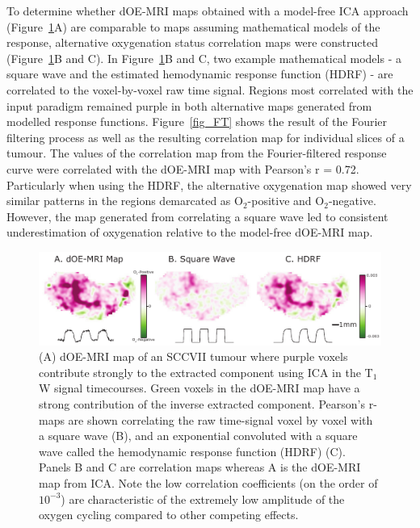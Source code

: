 To determine whether \acs{dOE-MRI} maps obtained with a model-free \acs{ICA} approach (Figure~\ref{fig_correlation}A) are comparable to maps assuming mathematical models of the response, alternative oxygenation status correlation maps were constructed (Figure~\ref{fig_correlation}B and C). 
In Figure~\ref{fig_correlation}B and C, two example mathematical models - a square wave and the estimated hemodynamic response function (HDRF) - are correlated to the voxel-by-voxel raw time signal. 
Regions most correlated with the input paradigm remained purple in both alternative maps generated from modelled response functions.
Figure~\ref{fig_FT} shows the result of the Fourier filtering process as well as the resulting correlation map for individual slices of a tumour.
The values of the correlation map from the Fourier-filtered response curve were correlated with the \acs{dOE-MRI} map with Pearson's r = 0.72.
Particularly when using the HDRF, the alternative oxygenation map showed very similar patterns in the regions demarcated as O$_2$-positive and O$_2$-negative. 
However, the map generated from correlating a square wave led to consistent underestimation of oxygenation relative to the model-free \acs{dOE-MRI} map.

\begin{figure}[htbp]
   \centering
   \includegraphics[width=\textwidth]{oemri_thesis1/oemri_thesis1-images/fig3_correlation.pdf} %
   \caption{(A) \acs{dOE-MRI} map of an SCCVII tumour where purple voxels contribute strongly to the extracted component using \acs{ICA} in the T$_1$W signal timecourses. 
Green voxels in the \acs{dOE-MRI} map have a strong contribution of the inverse extracted component. Pearson's r-maps are shown correlating the raw time-signal voxel by voxel with a square wave (B), and an exponential convoluted with a square wave called the hemodynamic response function (HDRF) (C).
Panels B and C are correlation maps whereas A is the \acs{dOE-MRI} map from \acs{ICA}. Note the low correlation coefficients (on the order of $10^{-3}$) are characteristic of the extremely low amplitude of the oxygen cycling compared to other competing effects.
   \label{fig_correlation}}
\end{figure}

